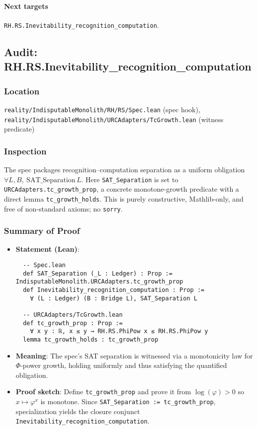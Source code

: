 \documentclass{article}
\newcommand{\FileRef}[1]{\texttt{#1}}
\begin{document}
\paragraph{Next targets} \texttt{RH.RS.Inevitability\_recognition\_computation}.

\subsection{Audit: RH.RS.Inevitability\_recognition\_computation}
\subsubsection{Location}
\FileRef{reality/IndisputableMonolith/RH/RS/Spec.lean} (spec hook),\\
\FileRef{reality/IndisputableMonolith/URCAdapters/TcGrowth.lean} (witness predicate)

\subsubsection{Inspection}
The spec packages recognition–computation separation as a uniform obligation \(\forall L,B,\ \mathrm{SAT\_Separation}\,L\). Here \texttt{SAT\_Separation} is set to \texttt{URCAdapters.tc\_growth\_prop}, a concrete monotone-growth predicate with a direct lemma \texttt{tc\_growth\_holds}. This is purely constructive, Mathlib-only, and free of non-standard axioms; no \texttt{sorry}.

\subsubsection{Summary of Proof}
\begin{itemize}[leftmargin=*]
  \item \textbf{Statement (Lean)}:
  \begin{lstlisting}
  -- Spec.lean
  def SAT_Separation (_L : Ledger) : Prop := IndisputableMonolith.URCAdapters.tc_growth_prop
  def Inevitability_recognition_computation : Prop :=
    ∀ (L : Ledger) (B : Bridge L), SAT_Separation L

  -- URCAdapters/TcGrowth.lean
  def tc_growth_prop : Prop :=
    ∀ x y : ℝ, x ≤ y → RH.RS.PhiPow x ≤ RH.RS.PhiPow y
  lemma tc_growth_holds : tc_growth_prop
  \end{lstlisting}
  \item \textbf{Meaning}: The spec's SAT separation is witnessed via a monotonicity law for \(\Phi\)-power growth, holding uniformly and thus satisfying the quantified obligation.
  \item \textbf{Proof sketch}: Define \texttt{tc\_growth\_prop} and prove it from \(\log(\varphi)>0\) so \(x\mapsto \varphi^x\) is monotone. Since \texttt{SAT\_Separation := tc\_growth\_prop}, specialization yields the closure conjunct \texttt{Inevitability\_recognition\_computation}.
\end{itemize}
\end{document}
